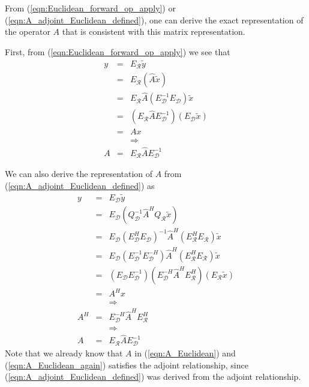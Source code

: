 From (\ref{eqn:Euclidean_forward_op_apply}) or
(\ref{eqn:A_adjoint_Euclidean_defined}), one can derive the exact
representation of the operator $A$ that is consistent with this matrix
representation.

First, from (\ref{eqn:Euclidean_forward_op_apply}) we see that
%
\begin{eqnarray}
y
& = & E_{\mathcal{R}} \tilde{y} \nonumber \\
& = & E_{\mathcal{R}} ( \hat{A} \tilde{x} ) \nonumber \\
& = & E_{\mathcal{R}} \hat{A} ( E_{\mathcal{D}}^{-1} E_{\mathcal{D}} ) \tilde{x} \nonumber \\
& = & ( E_{\mathcal{R}} \hat{A} E_{\mathcal{D}}^{-1} ) ( E_{\mathcal{D}} \tilde{x} ) \nonumber \\
& = & A x \nonumber \\
&  & \Rightarrow \nonumber \\
A & = & E_{\mathcal{R}} \hat{A} E_{\mathcal{D}}^{-1}
\label{eqn:A_Euclidean}
\end{eqnarray}
%

We can also derive the representation of $A$ from
(\ref{eqn:A_adjoint_Euclidean_defined}) as
%
\begin{eqnarray}
y
& = & E_{\mathcal{D}} \tilde{y} \nonumber \\
& = & E_{\mathcal{D}} ( Q_{\mathcal{D}}^{-1} \hat{A}^H Q_{\mathcal{R}} \tilde{x} ) \nonumber \\
& = & E_{\mathcal{D}} ( E_{\mathcal{D}}^H E_{\mathcal{D}} )^{-1} \hat{A}^H ( E_{\mathcal{R}}^H E_{\mathcal{R}} ) \tilde{x} \nonumber \\
& = & E_{\mathcal{D}} ( E_{\mathcal{D}}^{-1} E_{\mathcal{D}} ^{-H} ) \hat{A}^H ( E_{\mathcal{R}}^H E_{\mathcal{R}} ) \tilde{x} \nonumber \\
& = & ( E_{\mathcal{D}} E_{\mathcal{D}}^{-1} ) ( E_{\mathcal{D}} ^{-H} \hat{A}^H E_{\mathcal{R}}^H ) ( E_{\mathcal{R}} \tilde{x} ) \nonumber \\
& = & A^H x \nonumber \\
&  & \Rightarrow \nonumber \\
A^H & = & E_{\mathcal{D}}^{-H} \hat{A}^H E_{\mathcal{R}}^H  \nonumber \\
\label{eqn:A_Euclidean_adjoint} 
&  & \Rightarrow \nonumber \\
A & = & E_{\mathcal{R}} \hat{A} E_{\mathcal{D}}^{-1}
\label{eqn:A_Euclidean_again}
\end{eqnarray}
%
Note that we already know that $A$ in (\ref{eqn:A_Euclidean}) and
(\ref{eqn:A_Euclidean_again}) satisfies the adjoint relationship, since
(\ref{eqn:A_adjoint_Euclidean_defined}) was derived from the adjoint
relationship.

